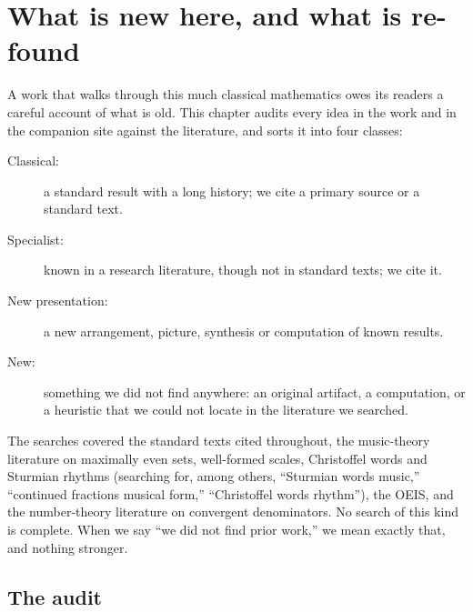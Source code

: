 \chapter{What is new here, and what is re-found}\label{ch:new}

A work that walks through this much classical mathematics owes its readers a careful account of what is old. This chapter audits every idea in the work and in the companion site against the literature, and sorts it into four classes:
\begin{description}
\item[Classical:] a standard result with a long history; we cite a primary source or a standard text.
\item[Specialist:] known in a research literature, though not in standard texts; we cite it.
\item[New presentation:] a new arrangement, picture, synthesis or computation of known results.
\item[New:] something we did not find anywhere: an original artifact, a computation, or a heuristic that we could not locate in the literature we searched.
\end{description}
The searches covered the standard texts cited throughout, the music-theory literature on maximally even sets, well-formed scales, Christoffel words and Sturmian rhythms (searching for, among others, ``Sturmian words music,'' ``continued fractions musical form,'' ``Christoffel words rhythm''), the OEIS, and the number-theory literature on convergent denominators. No search of this kind is complete. When we say ``we did not find prior work,'' we mean exactly that, and nothing stronger.

\section{The audit}

